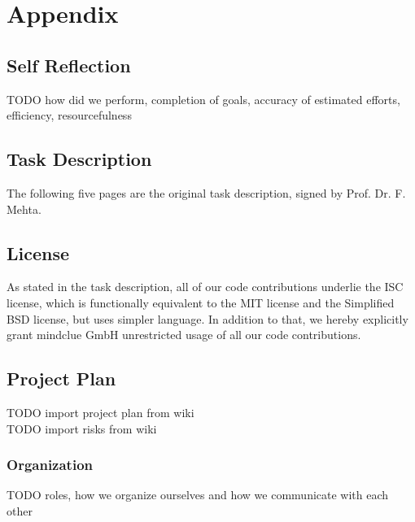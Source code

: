 \documentclass[a4paper]{report}
\begin{document}
\appendix
\part{Appendix}
\chapter{Self Reflection}
TODO how did we perform, completion of goals, accuracy of estimated efforts, efficiency, resourcefulness

\chapter{Task Description}\label{ch:task-desc}
The following five pages are the original task description, signed by Prof. Dr. F. Mehta.


\chapter{License}
As stated in the task description, all of our code contributions underlie the
ISC license, which is functionally equivalent to the MIT license and the
Simplified BSD license, but uses simpler language. In addition to that, we
hereby explicitly grant mindclue GmbH unrestricted usage of all our code
contributions.


\chapter{Project Plan}
TODO import project plan from wiki\\
TODO import risks from wiki\\

\section{Organization}
TODO roles, how we organize ourselves and how we communicate with each other



\end{document}
